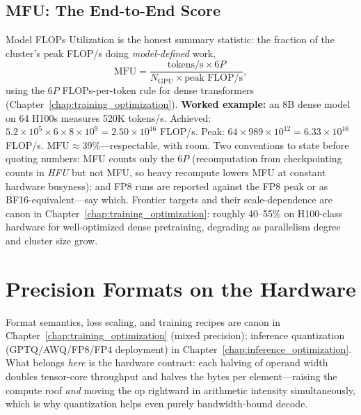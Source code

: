 \subsection{MFU: The End-to-End Score}

Model FLOPs Utilization is the honest summary statistic: the fraction of the cluster's peak FLOP/s doing \textit{model-defined} work,
\begin{equation}
\text{MFU} = \frac{\text{tokens/s} \times 6P}{N_{\text{GPU}} \times \text{peak FLOP/s}},
\end{equation}
using the $6P$ FLOPs-per-token rule for dense transformers (Chapter~\ref{chap:training_optimization}). \textbf{Worked example:} an 8B dense model on 64 H100s measures 520K tokens/s. Achieved: $5.2\times10^{5} \times 6 \times 8\times10^{9} = 2.50 \times 10^{16}$ FLOP/s. Peak: $64 \times 989 \times 10^{12} = 6.33 \times 10^{16}$ FLOP/s. $\text{MFU} \approx 39\%$---respectable, with room. Two conventions to state before quoting numbers: MFU counts only the $6P$ (recomputation from checkpointing counts in \textit{HFU} but not MFU, so heavy recompute lowers MFU at constant hardware busyness); and FP8 runs are reported against the FP8 peak or as BF16-equivalent---say which. Frontier targets and their scale-dependence are canon in Chapter~\ref{chap:training_optimization}: roughly 40--55\% on H100-class hardware for well-optimized dense pretraining, degrading as parallelism degree and cluster size grow.

\section{Precision Formats on the Hardware}
\label{sec:gpu_precision}

Format semantics, loss scaling, and training recipes are canon in Chapter~\ref{chap:training_optimization} (mixed precision); inference quantization (GPTQ/AWQ/FP8/FP4 deployment) in Chapter~\ref{chap:inference_optimization}. What belongs \textit{here} is the hardware contract: each halving of operand width doubles tensor-core throughput and halves the bytes per element---raising the compute roof \textit{and} moving the op rightward in arithmetic intensity simultaneously, which is why quantization helps even purely bandwidth-bound decode.


